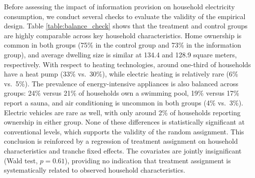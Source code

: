 Before assessing the impact of information provision on household electricity consumption, we conduct several checks to evaluate the validity of the empirical design. Table \ref{table:balance_check} shows that the treatment and control groups are highly comparable across key household characteristics. Home ownership is common in both groups (75\% in the control group and 73\% in the information group), and average dwelling size is similar at 134.4 and 128.9 square meters, respectively. With respect to heating technologies, around one-third of households have a heat pump (33\% vs.\ 30\%), while electric heating is relatively rare (6\% vs.\ 5\%). The prevalence of energy-intensive appliances is also balanced across groups: 24\% versus 21\% of households own a swimming pool, 19\% versus 17\% report a sauna, and air conditioning is uncommon in both groups (4\% vs.\ 3\%). Electric vehicles are rare as well, with only around 2\% of households reporting ownership in either group. None of these differences is statistically significant at conventional levels, which supports the validity of the random assignment.  This conclusion is reinforced by a regression of treatment assignment on household characteristics and tranche fixed effects. The covariates are jointly insignificant (Wald test, \(p = 0.61\)), providing no indication that treatment assignment is systematically related to observed household characteristics.


